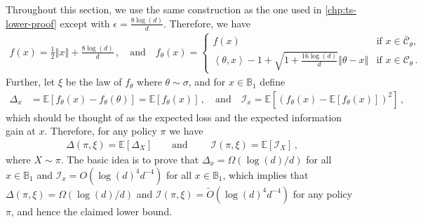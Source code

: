 \documentclass[letter, 12pt]{report}
\newcommand{\ip}[1]{\left \langle #1 \right \rangle}
\newcommand{\ball}{\mathbb{B}}
\newcommand{\paren}[1]{\left( #1 \right)}
\newcommand{\brak}[1]{\left[ #1 \right]}
\newcommand{\norm}[1]{\left \Vert  #1 \right \Vert}
\newcommand{\E}{\mathbb E}
\newcommand{\cC}{\mathcal C}
\newcommand{\I}{\mathcal{I}}
\newcommand{\1}{\mathbf{1}}
\theoremstyle{plain}
\theoremstyle{definition}
\theoremstyle{remark}
\begin{document}
Throughout this section, we use the same construction as the one used in \cref{chp:ts-lower-proof}
except with $\epsilon = \frac{8\log(d)}{d}$.
Therefore, we have
\begin{align*}
    f(x)         = \frac12 \norm{x} + \frac{8\log(d)}{d}\,, \quad \text{and} \quad
    f_\theta(x)  =
    \begin{cases}
        f(x)                                                                 & \text{if } x \in \bar{\cC}_{\theta}, \\
        \ip{\theta, x} - 1 + \sqrt{1 + \frac{16\log(d)}{d}}\norm{\theta - x} & \text{if } x \in \cC_{\theta}\,.
    \end{cases}
\end{align*}
Further, let $\xi$ be the law of $f_\theta$ where $\theta \sim \sigma$,
and for $x \in \mathbb{B}_1$ define
\begin{align*}
    \Delta_x & = \E\brak{
        f_\theta(x) - f_{\theta}(\theta)
    }
    = \E\brak{
        f_\theta(x)
    }\,, \quad \text{and} \quad
    \I_x = \E\brak{
        \paren{f_\theta(x) - \E\brak{f_\theta(x)}}^2
    } \,,
\end{align*}
which should be thought of as the expected loss and the expected information gain at $x$.
Therefore, for any policy $\pi$ we have
\begin{align*}
    \Delta(\pi, \xi) = \E[\Delta_X] \qquad \text{and } \qquad
    \I(\pi, \xi) = \E[\I_X] \,,
\end{align*}
where $X \sim \pi$.
The basic idea is to prove that $\Delta_x = \Omega(\log(d)/d)$ for all
$x \in \ball_1$ and $\I_x = O(\log(d)^4 d^{-4})$ for all $x \in \ball_1$,
which implies that $\Delta(\pi, \xi) = \Omega(\log(d)/d)$ and $\I(\pi, \xi) = \tilde O(\log(d)^4 d^{-4})$
for any policy $\pi$, and hence the claimed lower bound.
\end{document}
